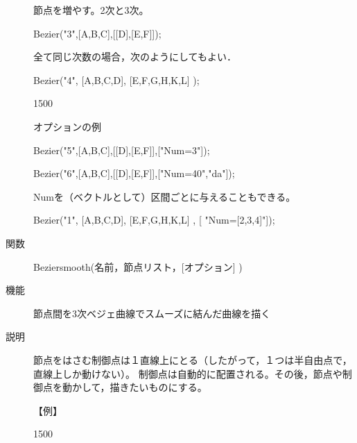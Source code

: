 \documentclass[papersize,a4paper,12pt,uplatex]{jsarticle}
\begin{document}
\begin{description}
節点を増やす。2次と3次。

Bezier("3",[A,B,C],[[D],[E,F]]);

\vspace{20mm}

全て同じ次数の場合，次のようにしてもよい．

Bezier("4", [A,B,C,D], [E,F,G,H,K,L] );   

\begin{layer}{150}{0}
\end{layer}

\vspace{35mm}

オプションの例

Bezier("5",[A,B,C],[[D],[E,F]],["Num=3"]);

\hspace{20mm}

Bezier("6",[A,B,C],[[D],[E,F]],["Num=40","da"]);

\hspace{20mm}

Numを（ベクトルとして）区間ごとに与えることもできる。

Bezier("1", [A,B,C,D], [E,F,G,H,K,L] , [ "Num=[2,3,4]"]);  

\hspace{10mm} 


\vspace{\baselineskip}
\hypertarget{beziersmooth}{}
\item[関数]  Beziersmooth(名前，節点リスト，[オプション] )
\item[機能]  節点間を3次ベジェ曲線でスムーズに結んだ曲線を描く
\item[説明]  節点をはさむ制御点は１直線上にとる（したがって，１つは半自由点で，直線上しか動けない）。
制御点は自動的に配置される。その後，節点や制御点を動かして，描きたいものにする。

\vspace{\baselineskip}
【例】

\begin{layer}{150}{0}
\end{layer}


\end{description}
\end{document}
